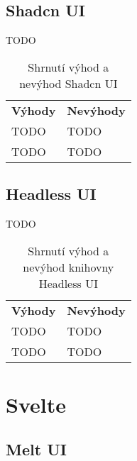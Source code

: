 \subsection{Shadcn UI}

TODO

\begin{table}[ht]
    \begin{ctucolortab}
        \begin{tabularx}{\textwidth}{Y Y}
            \bfseries \textcolor{OK}{Výhody} & \bfseries \textcolor{NOT_OK}{Nevýhody} \\\Midrule{}
            TODO                             & TODO                                   \\
            TODO                             & TODO
        \end{tabularx}
    \end{ctucolortab}
    \caption{Shrnutí výhod a nevýhod Shadcn UI}
\end{table}

\subsection{Headless UI}

TODO

\begin{table}[ht]
    \begin{ctucolortab}
        \begin{tabularx}{\textwidth}{Y Y}
            \bfseries \textcolor{OK}{Výhody} & \bfseries \textcolor{NOT_OK}{Nevýhody} \\\Midrule{}
            TODO                             & TODO                                   \\
            TODO                             & TODO
        \end{tabularx}
    \end{ctucolortab}
    \caption{Shrnutí výhod a nevýhod knihovny Headless UI}
\end{table}

\clearpage

\section{Svelte}

\subsection{Melt UI}

